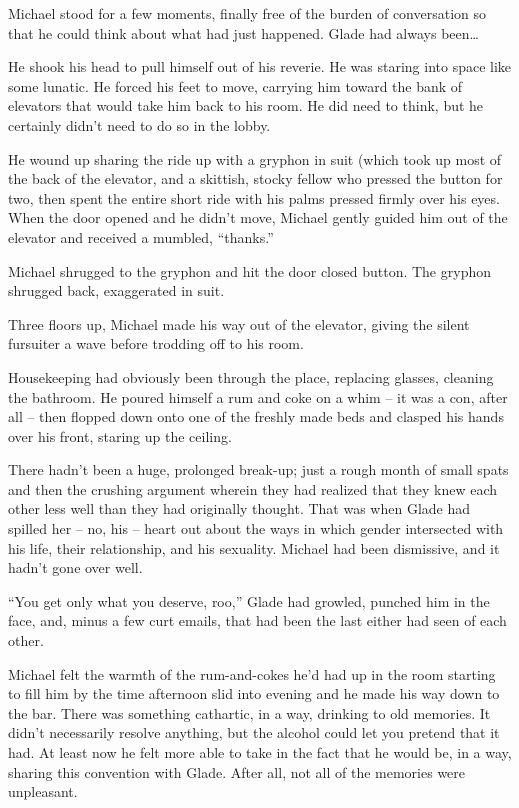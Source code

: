 Michael stood for a few moments, finally free of the burden of conversation so that he could think about what had just happened. Glade had always been\ldots{}

He shook his head to pull himself out of his reverie. He was staring into space like some lunatic. He forced his feet to move, carrying him toward the bank of elevators that would take him back to his room. He did need to think, but he certainly didn't need to do so in the lobby.

He wound up sharing the ride up with a gryphon in suit (which took up most of the back of the elevator, and a skittish, stocky fellow who pressed the button for two, then spent the entire short ride with his palms pressed firmly over his eyes. When the door opened and he didn't move, Michael gently guided him out of the elevator and received a mumbled, ``thanks.''

Michael shrugged to the gryphon and hit the door closed button. The gryphon shrugged back, exaggerated in suit.

Three floors up, Michael made his way out of the elevator, giving the silent fursuiter a wave before trodding off to his room.

Housekeeping had obviously been through the place, replacing glasses, cleaning the bathroom. He poured himself a rum and coke on a whim -- it was a con, after all -- then flopped down onto one of the freshly made beds and clasped his hands over his front, staring up the ceiling.

There hadn't been a huge, prolonged break-up; just a rough month of small spats and then the crushing argument wherein they had realized that they knew each other less well than they had originally thought. That was when Glade had spilled her -- no, his -- heart out about the ways in which gender intersected with his life, their relationship, and his sexuality. Michael had been dismissive, and it hadn't gone over well.

``You get only what you deserve, roo,'' Glade had growled, punched him in the face, and, minus a few curt emails, that had been the last either had seen of each other.

\secdiv{}

Michael felt the warmth of the rum-and-cokes he'd had up in the room starting to fill him by the time afternoon slid into evening and he made his way down to the bar. There was something cathartic, in a way, drinking to old memories. It didn't necessarily resolve anything, but the alcohol could let you pretend that it had. At least now he felt more able to take in the fact that he would be, in a way, sharing this convention with Glade. After all, not all of the memories were unpleasant.

